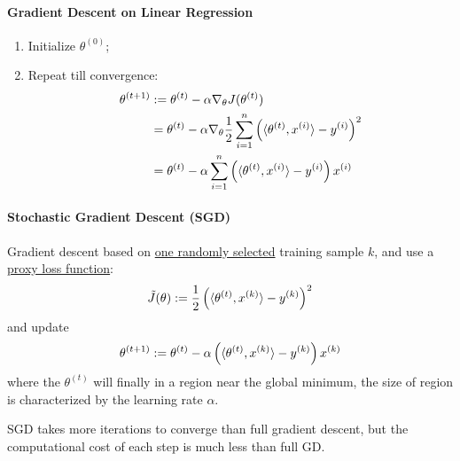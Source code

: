 \documentclass{report}
\begin{document}
        \paragraph{Gradient Descent on Linear Regression}
        \begin{enumerate}
            \item Initialize $\theta^{(0)}$;
            \item Repeat till convergence:
            \begin{align}
                \theta^{(t+1)} &:= \theta^{(t)} - \alpha \nabla_\theta J(\theta^{(t)}) \\
                &= \theta^{(t)} - \alpha \nabla_\theta \frac{1}{2} \sum_{i=1}^n \left( \langle {\theta^{(t)}}, {x^{(i)}} \rangle - y^{(i)} \right )^2 \\
                &= \theta^{(t)} - \alpha \sum_{i=1}^n \left( \langle {\theta^{(t)}}, {x^{(i)}} \rangle - y^{(i)} \right ) x^{(i)}
            \end{align}
        \end{enumerate}
        
        \paragraph{Stochastic Gradient Descent (SGD)} Gradient descent based on \ul{one randomly selected} training sample $k$, and use a \ul{proxy loss function}:
        \begin{align}
            \tilde{J}(\theta) := \frac{1}{2} \left( \langle {\theta^{(t)}}, {x^{(k)}} \rangle - y^{(k)} \right )^2
        \end{align}
        and update
        \begin{align}
            \theta^{(t+1)} := \theta^{(t)} - \alpha \left( \langle {\theta^{(t)}}, {x^{(k)}} \rangle - y^{(k)} \right ) x^{(k)}
        \end{align}
        where the $\theta^{(t)}$ will finally in a region near the global minimum, the size of region is characterized by the learning rate $\alpha$.
        \begin{remark}
            SGD takes more iterations to converge than full gradient descent, but the computational cost of each step is much less than full GD.
        \end{remark}
\end{document}
